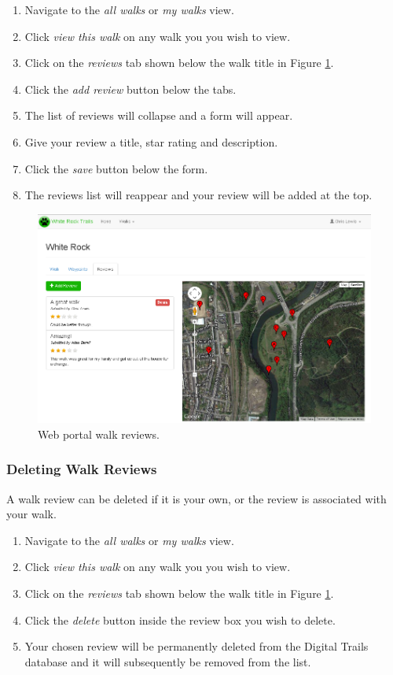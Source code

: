 \documentclass[11pt,a4paper]{report}
\begin{document}
\begin{enumerate}
\item Navigate to the \emph{all walks} or \emph{my walks} view.
\item Click \emph{view this walk} on any walk you you wish to view.
\item Click on the \emph{reviews} tab shown below the walk title in Figure \ref{fig:walk-reviews-guide}.
\item Click the \emph{add review} button below the tabs.
\item The list of reviews will collapse and a form will appear.
\item Give your review a title, star rating and description.
\item Click the \emph{save} button below the form.
\item The reviews list will reappear and your review will be added at the top.
\end{enumerate}

\begin{figure}[H]
\centering
\includegraphics[width=0.8\linewidth]{./img/webportal/walk-reviews}
\caption{Web portal walk reviews.}
\label{fig:walk-reviews-guide}
\end{figure}

\subsubsection{Deleting Walk Reviews}

A walk review can be deleted if it is your own, or the review is associated with your walk.

\begin{enumerate}
\item Navigate to the \emph{all walks} or \emph{my walks} view.
\item Click \emph{view this walk} on any walk you you wish to view.
\item Click on the \emph{reviews} tab shown below the walk title in Figure \ref{fig:walk-reviews-guide}.
\item Click the \emph{delete} button inside the review box you wish to delete.
\item Your chosen review will be permanently deleted from the Digital Trails database and it will subsequently be removed from the list.
\end{enumerate}
\end{document}

